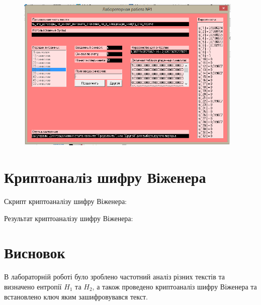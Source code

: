 \documentclass[a4paper,12pt]{article}
\begin{document}
\begin{figure}[h]
  \begin{center}
    \includegraphics[width=0.97\textwidth]{3.png}
  \end{center}
\end{figure}
\FloatBarrier
\newpage
\section*{Криптоаналіз шифру Віженера}
{\large Скрипт криптоаналізу шифру Віженера:}

{\large Результат криптоаналізу шифру Віженера:}
\section*{Висновок}
В лабораторній роботі було зроблено частотний аналіз різних текстів та визначено ентропії \( H_1 \) та \( H_2 \), а також проведено криптоаналіз шифру Віженера та встановлено ключ яким зашифровувався текст.
\end{document}
